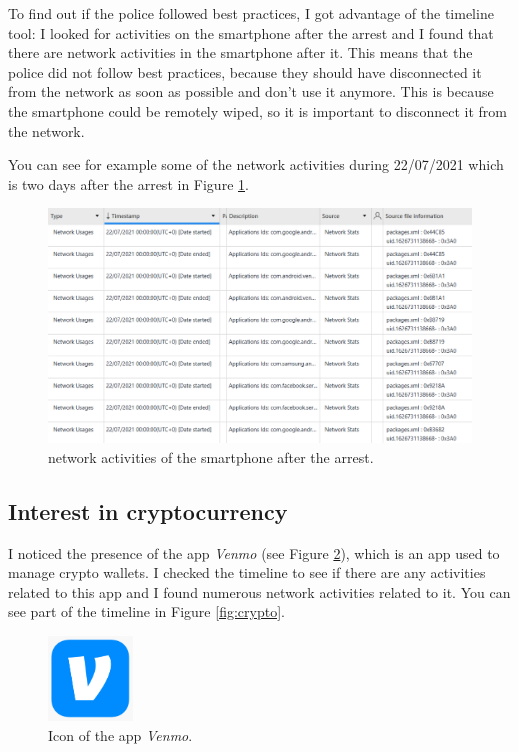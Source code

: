 \documentclass[12pt]{article}
\begin{document}
To find out if the police followed best practices, I got advantage of the timeline tool: I looked for activities on the smartphone after the arrest and I found that there are network activities in the smartphone after it. This means that the police did not follow best practices, because they should have disconnected it from the network as soon as possible and don't use it anymore. This is because the smartphone could be remotely wiped, so it is important to disconnect it from the network.

You can see for example some of the network activities during 22/07/2021 which is two days after the arrest in Figure \ref{fig:pbp}.

\begin{figure}[!ht]
    \centering
    \includegraphics[width=\textwidth]{images/pbp.png}
    \caption{network activities of the smartphone after the arrest.}
    \label{fig:pbp}
\end{figure}

\subsection{Interest in cryptocurrency}

I noticed the presence of the app \textit{Venmo} (see Figure \ref{fig:venmo-icon}), which is an app used to manage crypto wallets. I checked the timeline to see if there are any activities related to this app and I found numerous network activities related to it. You can see part of the timeline in Figure \ref{fig:crypto}.

\begin{figure}[!ht]
    \centering
    \includegraphics[width=0.2\textwidth]{images/venmo.png}
    \caption{Icon of the app \textit{Venmo}.}
    \label{fig:venmo-icon}
\end{figure}
\end{document}
